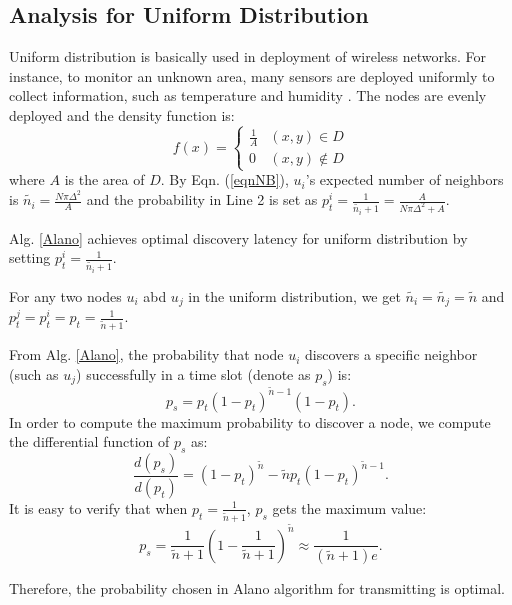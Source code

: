 \subsection{Analysis for Uniform Distribution}
\label{uniform}
Uniform distribution is basically used in deployment of wireless networks.
For instance, to monitor an unknown area, many sensors are deployed uniformly to collect information, such as temperature and humidity \cite{flammini2007real}. The nodes are evenly deployed and the density function is:
$$f(x)=
\begin{cases}
\frac{1}{A}& (x,y)\in D\\
0& (x,y)\notin D
\end{cases}$$
where $A$ is the area of $D$.
By Eqn. (\ref{eqnNB}), $u_i$'s expected number of neighbors is $\widetilde{n_i} = \frac{N\pi \Delta^2}{A}$ and the probability in Line 2 is set as $p_t^i = \frac{1}{\widetilde{n_i}+1}=\frac{A}{N\pi \Delta^2+A}$. 
\begin{lemma}
Alg. \ref{Alano} achieves optimal discovery latency for uniform distribution by setting $p_t^i = \frac{1}{\widetilde{n_i}+1}$.
\end{lemma}
\begin{IEEEproof}
For any two nodes $u_i$ abd $u_j$ in the uniform distribution, we get $\widetilde{n_i} = \widetilde{n_j} = \widetilde{n}$ and $p_t^j = p_t^ i = p_t = \frac{1}{\widetilde{n}+1}$.



From Alg. \ref{Alano}, the probability that node $u_i$ discovers a specific neighbor (such as $u_j$) successfully in a time slot (denote as $p_s$) is:
$$
p_s = p_t{(1-p_t)}^{\widetilde{n}-1}(1-p_t).
$$
In order to compute the maximum probability to discover a node, we compute the differential function of $p_s$ as:
$$
\frac{d(p_s)}{d(p_t)} = {(1-p_t)}^{\widetilde{n}}-\widetilde{n}p_t{(1-p_t)}^{\widetilde{n}-1}.
$$
It is easy to verify that when $p_t=\frac{1}{\widetilde{n}+1}$, $p_s$ gets the maximum value:
$$p_s = \frac{1}{\widetilde{n}+1}{(1-\frac{1}{\widetilde{n}+1})}^{\widetilde{n}} \approx \frac{1}{(\widetilde{n}+1)e}.$$

Therefore, the probability chosen in Alano algorithm for transmitting is optimal.
\end{IEEEproof}



